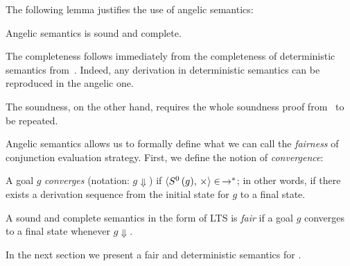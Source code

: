 The following lemma justifies the use of angelic semantics:

\begin{lemma}
  Angelic semantics is sound and complete.
\end{lemma}
\begin{proofsketch}
  The completeness follows immediately from the completeness of deterministic semantics from~\cite{fair:semantics}. Indeed, any derivation in deterministic semantics can be reproduced in
  the angelic one.

  The soundness, on the other hand, requires the whole soundness proof from~\cite{fair:semantics} to be repeated. 
\end{proofsketch}

Angelic semantics allows us to formally define what we can call the \emph{fairness} of conjunction evaluation strategy. First, we define the notion of \emph{convergence}:

\begin{definition}[Convergence]
  A goal $g$ \emph{converges} (notation: $g\Downarrow$) if $\langle S^0\,(g),\,\times \rangle\in\,\rightarrow^*$; in other words, if there exists a derivation sequence from the initial state for $g$ to a
  final state.
\end{definition}

\begin{comment}
Let us have some other \emph{deterministic} semantics in the form of a labeled transition system; more specifically, let us have

\begin{itemize}
\item a set of states $\widetilde{\mathfrak{S}}$;
\item a set of labels $\widetilde{L}$;
\item a ternary transition relation $\mbox{``}\dashrightarrow\mbox{''}\subseteq\widetilde{\mathfrak{S}}\times\widetilde{L}\times\widetilde{\mathfrak{S}}$ such that for all $s, s^\prime, s^{\prime\prime}\in\widetilde{\mathfrak{S}}$ and $l^\prime, l^{\prime\prime}\in\widetilde{L}$

  \[
  s\overset{l^\prime}{\dashrightarrow}s^\prime\wedge s\overset{l^{\prime\prime}}{\dashrightarrow}s^{\prime\prime}\Longrightarrow s^\prime=s^{\prime\prime}\wedge l^\prime=l^{\prime\prime}
  \]
  
\item a final state $\widetilde{\times}\in\widetilde{\mathfrak{S}}$ such that $\inbr{\widetilde{\times},\,\_,\,\_}\not\in\mbox{``}\dashrightarrow\mbox{''}$;
\item an initial state $\widetilde{S}^0(g)$ for each top-level goal $g$.
\end{itemize}
\end{comment}

\begin{definition}[Fairness]
  A sound and complete semantics in the form of LTS is \emph{fair} if a goal $g$ converges to a final state whenever $g\Downarrow$.
\end{definition}

In the next section we present a fair and deterministic semantics for \mk.

